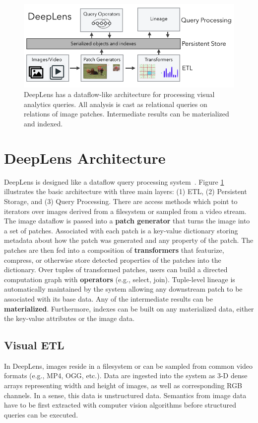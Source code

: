\begin{figure}[t]
\centering
 \includegraphics[width=\columnwidth]{figures/teaser.png}
 \caption{DeepLens has a dataflow-like architecture for processing visual analytics queries. All analysis is cast as relational queries on relations of image patches. Intermediate results can be materialized and indexed.  \label{teaser} }
\end{figure}

\section{DeepLens Architecture}
\textsf{DeepLens} is designed like a dataflow query processing system~\cite{graefe1994volcano}.
Figure \ref{teaser} illustrates the basic architecture with three main layers: (1) ETL, (2) Persistent Storage, and (3) Query Processing.
There are access methods which point to iterators over images derived from a filesystem or sampled from a video stream. The image dataflow is passed into a  \textbf{patch generator} that turns the image into a set of patches. Associated with each patch is a key-value dictionary storing metadata about how the patch was generated and any property of the patch. The patches are then fed into a composition of \textbf{transformers} that featurize, compress, or otherwise store detected properties of the patches into the dictionary. Over tuples of transformed patches, users can build a directed computation graph with \textbf{operators} (e.g., select, join).
Tuple-level lineage is automatically maintained by the system allowing any downstream patch to be associated with its base data.
Any of the intermediate results can be \textbf{materialized}. 
Furthermore, indexes can be built on any materialized data, either the key-value attributes or the image data.


\subsection{Visual ETL}
\label{subsection:visualETL}
In \textsf{DeepLens},  images reside in a filesystem or can be sampled from common video formats (e.g., MP4, OGG, etc.). Data are ingested into the system as 3-D dense arrays representing width and height of images, as well as  corresponding RGB channels. In a sense, this data is unstructured data. Semantics from image data have to be first extracted with computer vision algorithms before structured queries can be executed. 

